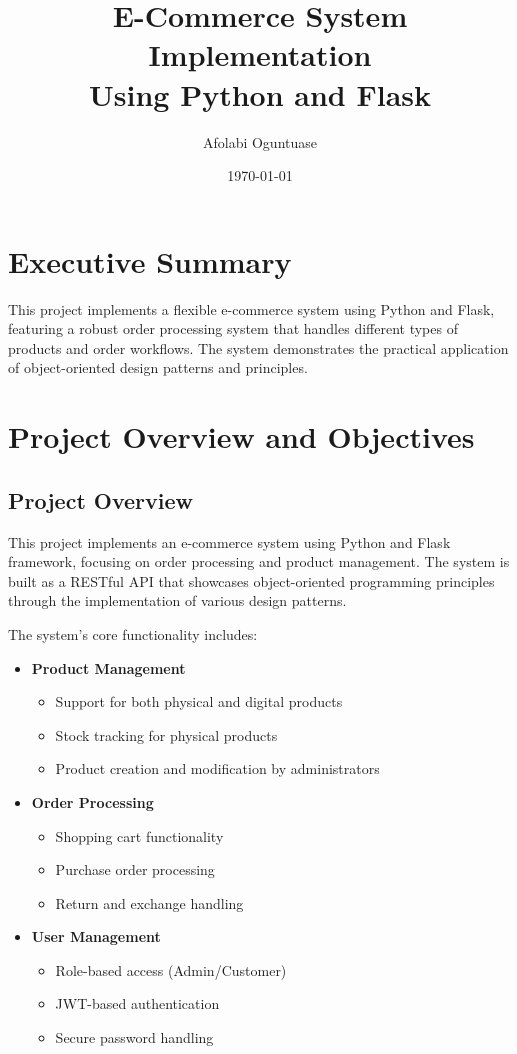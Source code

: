 \documentclass[12pt,a4paper]{article}
\title{E-Commerce System Implementation\\
       Using Python and Flask}
\author{Afolabi Oguntuase}
\date{\today}
\begin{document}
\maketitle
\newpage

\tableofcontents
\newpage

\section{Executive Summary}
This project implements a flexible e-commerce system using Python and Flask, featuring a robust order processing system that handles different types of products and order workflows. The system demonstrates the practical application of object-oriented design patterns and principles.

\section{Project Overview and Objectives}

\subsection{Project Overview}
This project implements an e-commerce system using Python and Flask framework, focusing on order processing and product management. The system is built as a RESTful API that showcases object-oriented programming principles through the implementation of various design patterns.

The system's core functionality includes:

\begin{itemize}
    \item \textbf{Product Management}
    \begin{itemize}
        \item Support for both physical and digital products
        \item Stock tracking for physical products
        \item Product creation and modification by administrators
    \end{itemize}

    \item \textbf{Order Processing}
    \begin{itemize}
        \item Shopping cart functionality
        \item Purchase order processing
        \item Return and exchange handling
    \end{itemize}

    \item \textbf{User Management}
    \begin{itemize}
        \item Role-based access (Admin/Customer)
        \item JWT-based authentication
        \item Secure password handling
    \end{itemize}
\end{itemize}
\end{document}

